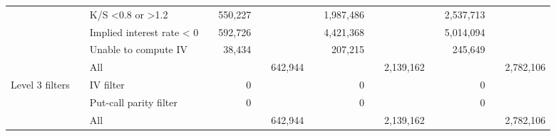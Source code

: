 \begin{tabular}{*{4}{l} *{11}{r} }
				  & & K/S <0.8 or >1.2 & &
				550,227 & &  & &
				1,987,486 & &  & &
				2,537,713 & &  \\
			
				  & & Implied interest rate < 0 & &
				592,726 & &  & &
				4,421,368 & &  & &
				5,014,094 & &  \\
			
				  & & Unable to compute IV & &
				38,434 & &  & &
				207,215 & &  & &
				245,649 & &  \\
			
				  & & All & &
				 & & 642,944 & &
				 & & 2,139,162 & &
				 & & 2,782,106 \\
			
				Level 3 filters & & IV filter & &
				0 & &  & &
				0 & &  & &
				0 & &  \\
			
				  & & Put-call parity filter & &
				0 & &  & &
				0 & &  & &
				0 & &  \\
			
				  & & All & &
				 & & 642,944 & &
				 & & 2,139,162 & &
				 & & 2,782,106 \\
			

	        \hline
	    \end{tabular}
	